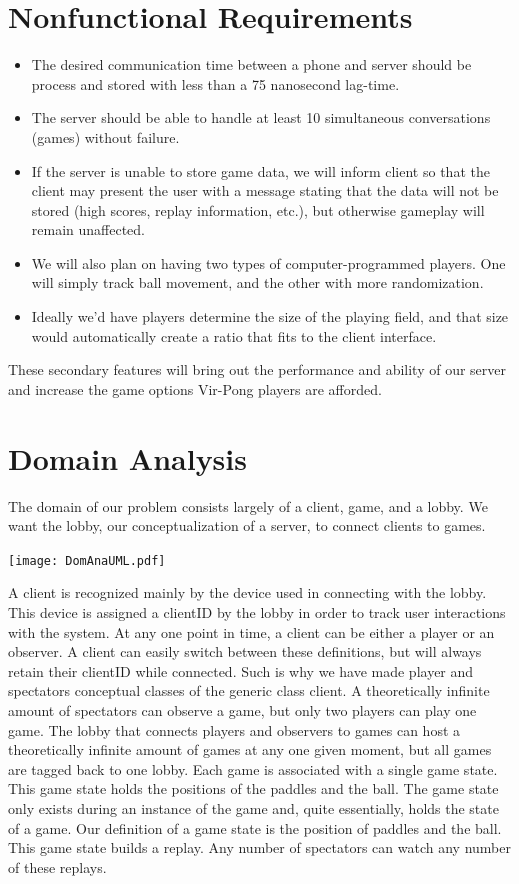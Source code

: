 \documentclass[letterpaper,12pt]{article}
\begin{document}
\section{Nonfunctional Requirements}
\begin{itemize}
\item The desired communication time between a phone and server should be process and stored with less than a 75 nanosecond lag-time.
\item The server should be able to handle at least 10 simultaneous conversations (games) without failure. 
\item If the server is unable to store game data, we will inform client so that the client may present the user with a message stating that the data will not be stored (high scores, replay information, etc.), but otherwise gameplay will remain unaffected. 
\item We will also plan on having two types of computer-programmed players. One will simply track ball movement, and the other with more randomization. 
\item Ideally we'd have players determine the size of the playing field, and that size would automatically create a ratio that fits to the client interface. 
\end{itemize}
These secondary features will bring out the performance and ability of our server and increase the game options Vir-Pong players are afforded. 
\section{Domain Analysis}
The domain of our problem consists largely of a client, game, and a lobby. We want the lobby, our conceptualization of a server, to connect clients to games.\\
\begin{center}\texttt{[image: DomAnaUML.pdf]} \end{center} 
A client is recognized mainly by the device used in connecting with the lobby. This device is assigned a clientID by the lobby in order to track user interactions with the system. At any one point in time, a client can be either a player or an observer. A client can easily switch between these definitions, but will always retain their clientID while connected. Such is why we have made player and spectators conceptual classes of the generic class client. A theoretically infinite amount of spectators can observe a game, but only two players can play one game. The lobby that connects players and observers to games can host a theoretically infinite amount of games at any one given moment, but all games are tagged back to one lobby. Each game is associated with a single game state. This game state holds the positions of the paddles and the ball. The game state only exists during an instance of the game and, quite essentially, holds the state of a game. Our definition of a game state is the position of paddles and the ball. This game state builds a replay. Any number of spectators can watch any number of these replays. 
\end{document}
